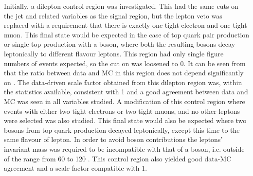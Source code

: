 Initially, a dilepton control region was investigated. This had the same cuts on the jet and \MET related variables as the signal region, but the lepton veto was replaced with a requirement that there is exactly one tight electron and one tight muon. This final state would be expected in the case of top quark pair production or single top production with a \PW boson, where both the resulting \PW bosons decay leptonically to different flavour leptons. This region had only single figure numbers of events expected, so the cut on \jetmetdphi was loosened to 0. It can be seen from  that the ratio between data and MC in this region does not depend significantly on \jetmetdphi. The data-driven scale factor obtained from this dilepton region was, within the statistics available, consistent with 1 and a good agreement between data and \ac{MC} was seen in all variables studied. A modification of this control region where events with either two tight electrons or two tight muons, and no other leptons were selected was also studied. This final state would also be expected where two \PW bosons from top quark production decayed leptonically, except this time to the same flavour of lepton. In order to avoid \PZ boson contributions the leptons' invariant mass was required to be incompatible with that of a \PZ boson, i.e. outside of the range from 60 to 120 \GeV. This control region also yielded good data-\ac{MC} agreement and a scale factor compatible with 1. 

